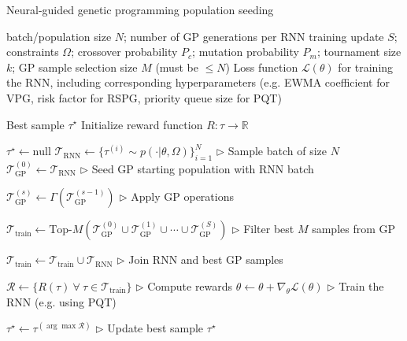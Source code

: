 \documentclass{article}
\newcommand\RCOMMENT[1]{\hfill\(\triangleright\) #1}
\newcommand{\RETURN}[1]{\STATE \textbf{return} #1}
\begin{document}
\begin{algorithm*}[t]
\caption{Neural-guided genetic programming population seeding}
\label{alg:algorithm}
\begin{algorithmic}[1]
\INPUT batch/population size $N$; number of GP generations per RNN training update $S$; constraints $\Omega$; crossover probability $P_c$; mutation  probability $P_m$; tournament size $k$; GP sample selection size $M$ (must be $\leq N$)
\INPUT Loss function $\mathcal{L}(\theta)$ for training the RNN, including corresponding hyperparameters (e.g. EWMA coefficient for VPG, risk factor for RSPG, priority queue size for PQT)

\OUTPUT Best sample $\tau^\star$
\STATE Initialize reward function $R : \tau \rightarrow \mathbb{R}$

\STATE $\tau^\star \leftarrow \textrm{null}$
    \STATE $\mathcal{T}_\textrm{RNN} \leftarrow \{\tau^{(i)} \sim p(\cdot | \theta, \Omega)\}_{i=1}^N$ \RCOMMENT{Sample batch of size $N$}
    \STATE $\mathcal{T}_\textrm{GP}^{(0)} \leftarrow \mathcal{T}_\textrm{RNN}$ \RCOMMENT{Seed GP starting population with RNN batch}
    
        \STATE $\mathcal{T}_\textrm{GP}^{(s)} \leftarrow \Gamma\left(\mathcal{T}_\textrm{GP}^{(s-1)}\right)$ \RCOMMENT{Apply GP operations}
    \ENDFOR

    \STATE $\mathcal{T}_\textrm{train} \leftarrow \textrm{Top-}M\left(\mathcal{T}_\textrm{GP}^{(0)} \cup \mathcal{T}_\textrm{GP}^{(1)} \cup \cdots \cup \mathcal{T}_\textrm{GP}^{(S)}\right)$ \RCOMMENT{Filter best $M$ samples from GP}
    
    \STATE $\mathcal{T}_\textrm{train} \leftarrow \mathcal{T}_\textrm{train} \cup \mathcal{T}_\textrm{RNN}$ \RCOMMENT{Join RNN and best GP samples}
    
    \STATE $\mathcal{R} \leftarrow \{R(\tau) \ \forall \ \tau\in\mathcal{T}_\textrm{train} \}$ \RCOMMENT{Compute rewards}
    \STATE $\theta \leftarrow \theta + \nabla_\theta \mathcal{L}(\theta)$ \RCOMMENT{Train the RNN (e.g. using PQT)}
    
     {$\tau^\star \leftarrow \tau^{(\arg\max \mathcal{R})}$} \RCOMMENT{Update best sample}
\ENDWHILE
\RETURN $\tau^\star$
\end{algorithmic}
\end{algorithm*}
\end{document}
